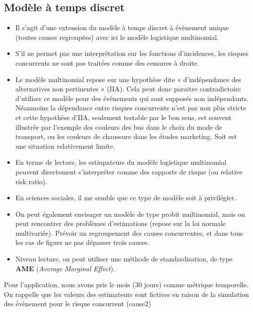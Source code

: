 \documentclass[
  12pt,
  letterpaper,
  DIV=11,
  numbers=noendperiod,
  onepage,
  openany]{scrreprt}
\begin{document}
\hypertarget{moduxe8le-uxe0-temps-discret-1}{%
\subsection{Modèle à temps
discret}\label{moduxe8le-uxe0-temps-discret-1}}

\begin{itemize}
\item
  Il s'agit d'une extension du modèle à temps discret à évènement unique
  (toutes causes regroupées) avec ici le modèle logistique multinomial.
\item
  S'il ne permet pas une interprétation sur les fonctions d'incidences,
  les risques concurrents ne sont pas traitées comme des censures à
  droite.
\item
  Le modèle multinomial repose sur une hypothèse dite « d'indépendance
  des alternatives non pertinentes » (IIA). Cela peut donc paraitre
  contradictoire d'utiliser ce modèle pour des évènements qui sont
  supposés non indépendants. Néanmoins la dépendance entre risques
  concurrents n'est pas non plus stricte et cette hypothèse d'IIA,
  seulement testable par le bon sens, est souvent illustrée par
  l'exemple des couleurs des bus dans le choix du mode de transport, ou
  les couleurs de chaussure dans les études marketing. Soit est une
  situation relativement limite.
\item
  En terme de lecture, les estiupateurs du modèle logistique multinomial
  peuvent directement s'interpréter comme des rapports de risque (ou
  relative risk ratio).
\item
  En sciences sociales, il me semble que ce type de modèle soit à
  privilégier.
\item
  On peut également envisager un modèle de type probit multinomial, mais
  on peut rencontrer des problèmes d'estimations (repose sur la loi
  normale multivariée). Prévoir un regroupement des causes concurrentes,
  et dans tous les cas de figure ne pas dépasser trois causes.
\item
  Niveau lecture, on peut utiliser une méthode de standardisation, de
  type \textbf{AME} (\emph{Average Marginal Effect}).
\end{itemize}

Pour l'application, nous avons pris le mois (30 jours) comme métrique
temporelle. On rappelle que les valeurs des estimateurs sont fictives en
raison de la simulation des évènement pour le risque concurrent (cause2)
\end{document}
